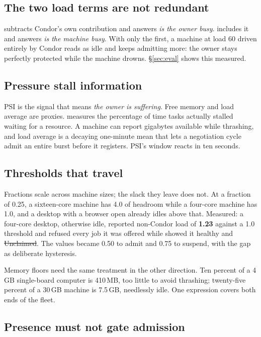 \subsection{The two load terms are not redundant}

 subtracts Condor's own contribution and answers \emph{is the
owner busy}.  includes it and answers \emph{is the machine
busy}. With only the first, a machine at load 60 driven entirely by Condor reads
as idle and keeps admitting more: the owner stays perfectly protected while the
machine drowns. \S\ref{sec:eval} shows this measured.

\subsection{Pressure stall information}

PSI is the signal that means \emph{the owner is suffering}. Free memory and load
average are proxies.  measures the percentage of time
tasks actually stalled waiting for a resource. A machine can report gigabytes
available while thrashing, and load average is a decaying one-minute mean that
lets a negotiation cycle admit an entire burst before it registers. PSI's
 window reacts in ten seconds.

\subsection{Thresholds that travel}

Fractions scale across machine sizes; the slack they leave does not. At a
fraction of 0.25, a sixteen-core machine has 4.0 of headroom while a four-core
machine has 1.0, and a desktop with a browser open already idles above that.
Measured: a four-core desktop, otherwise idle, reported non-Condor load of
\textbf{1.23} against a 1.0 threshold and refused every job it was offered while
 showed it healthy and \st{Unclaimed}. The values became 0.50
to admit and 0.75 to suspend, with the gap as deliberate hysteresis.

Memory floors need the same treatment in the other direction. Ten percent of a
4\,GB single-board computer is 410\,MB, too little to avoid thrashing; twenty-five
percent of a 30\,GB machine is 7.5\,GB, needlessly idle. One 
expression covers both ends of the fleet.

\subsection{Presence must not gate admission}

